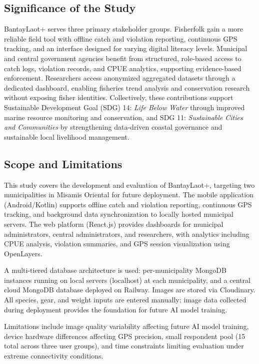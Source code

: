 \documentclass{icsthesis}
\begin{document}
\begin{mainmatter}
\subsection{Significance of the Study}

BantayLaot+ serves three primary stakeholder groups. Fisherfolk gain a more reliable
field tool with offline catch and violation reporting, continuous GPS tracking, and an
interface designed for varying digital literacy levels. Municipal and central government
agencies benefit from structured, role-based access to catch logs, violation records, and
CPUE analytics, supporting evidence-based enforcement. Researchers access anonymized
aggregated datasets through a dedicated dashboard, enabling fisheries trend analysis and
conservation research without exposing fisher identities. Collectively, these contributions
support Sustainable Development Goal (SDG) 14: \textit{Life Below Water} through improved
marine resource monitoring and conservation, and SDG 11: \textit{Sustainable Cities and
Communities} by strengthening data-driven coastal governance and sustainable local
livelihood management.

\subsection{Scope and Limitations}

This study covers the development and evaluation of BantayLaot+, targeting two
municipalities in Misamis Oriental for future deployment. The mobile application (Android/Kotlin) supports offline catch
and violation reporting, continuous GPS tracking, and background data synchronization to
locally hosted municipal servers. The web platform (React.js) provides dashboards for municipal administrators, central
administrators, and researchers, with analytics including CPUE analysis, violation
summaries, and GPS session visualization using OpenLayers.

A multi-tiered database architecture is used: per-municipality MongoDB instances running
on local servers (localhost) at each municipality, and a central cloud MongoDB database
deployed on Railway. Images are stored via Cloudinary. All species, gear, and weight
inputs are entered manually; image data collected during deployment provides the
foundation for future AI model training.

Limitations include image quality variability affecting future AI model training, device
hardware differences affecting GPS precision, small respondent pool (15 total across
three user groups), and time constraints limiting evaluation under extreme connectivity
conditions.
		

\end{mainmatter}
\end{document}
